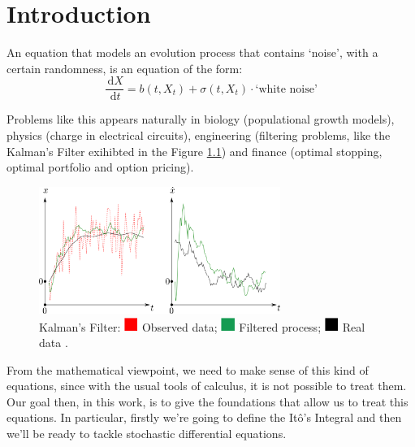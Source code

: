 \chapter{Introduction}


An equation that models an evolution process that contains `noise', with a certain randomness, is an equation of the form:
\begin{equation}\label{eq:sde}
	\frac{\, \mathrm{d}X}{\, \mathrm{d}t} = b(t,X_t) + \sigma(t,X_t)\cdot \text{`white noise'}
\end{equation}

Problems like this appears naturally in biology (populational growth models), physics (charge in electrical circuits), engineering (filtering problems, like the Kalman's Filter exihibted in the Figure \ref{fig:kalman}) and finance (optimal stopping, optimal portfolio and option pricing).

\begin{figure}[h]
  \centering
    \includegraphics[width=0.7\textwidth]{Figures/Kalman.png} 
    \caption{Kalman's Filter: $\crule[red]{0.4cm}{0.4cm}$ Observed data; $\crule[ForestGreen]{0.4cm}{0.4cm}$ Filtered process; $\crule{0.4cm}{0.4cm}$ Real data \cite{wiki:Kalman_filter}.}
    \label{fig:kalman}
\end{figure}

From the mathematical viewpoint, we need to make sense of this kind of equations, since with the usual tools of calculus, it is not possible to treat them. Our goal then, in this work, is to give the foundations that allow us to treat this equations. In particular, firstly we're going to define the Itô's Integral and then we'll be ready to tackle stochastic differential equations.
